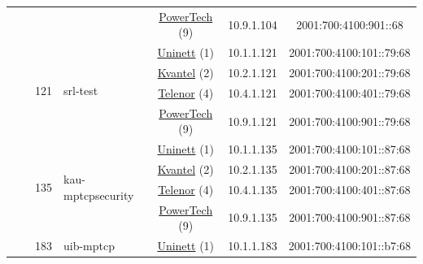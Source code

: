 \begin{small}
\begin{center}
\begin{longtable}{|c|c|c|c|c|c|c|c|}
  &  & \multicolumn{2}{|c|}{} & \multicolumn{2}{|c|}{\tiny{\href{http://www.powertech.no}{PowerTech} (9)}} & \tiny{10.9.1.104} & \tiny{2001:700:4100:901::68} \\* \cline{3-3}\cline{4-4}\cline{5-5}\cline{6-6}\cline{7-7}\cline{8-8}
  &  & \multirow{4}{*}{\tiny{121}} & \multicolumn{1}{|l|}{\multirow{4}{*}{\tiny{srl-test}}} & \multicolumn{2}{|c|}{\tiny{\href{https://www.uninett.no}{Uninett} (1)}} & \tiny{10.1.1.121} & \tiny{2001:700:4100:101::79:68} \\* \cline{5-5}\cline{6-6}\cline{7-7}\cline{8-8}
  &  &  &  & \multicolumn{2}{|c|}{\tiny{\href{http://kvantel.no}{Kvantel} (2)}} & \tiny{10.2.1.121} & \tiny{2001:700:4100:201::79:68} \\* \cline{5-5}\cline{6-6}\cline{7-7}\cline{8-8}
  &  &  &  & \multicolumn{2}{|c|}{\tiny{\href{https://www.telenor.no}{Telenor} (4)}} & \tiny{10.4.1.121} & \tiny{2001:700:4100:401::79:68} \\* \cline{5-5}\cline{6-6}\cline{7-7}\cline{8-8}
  &  &  &  & \multicolumn{2}{|c|}{\tiny{\href{http://www.powertech.no}{PowerTech} (9)}} & \tiny{10.9.1.121} & \tiny{2001:700:4100:901::79:68} \\* \cline{3-3}\cline{4-4}\cline{5-5}\cline{6-6}\cline{7-7}\cline{8-8}
  &  & \multirow{4}{*}{\tiny{135}} & \multicolumn{1}{|l|}{\multirow{4}{*}{\tiny{kau-mptcpsecurity}}} & \multicolumn{2}{|c|}{\tiny{\href{https://www.uninett.no}{Uninett} (1)}} & \tiny{10.1.1.135} & \tiny{2001:700:4100:101::87:68} \\* \cline{5-5}\cline{6-6}\cline{7-7}\cline{8-8}
  &  &  &  & \multicolumn{2}{|c|}{\tiny{\href{http://kvantel.no}{Kvantel} (2)}} & \tiny{10.2.1.135} & \tiny{2001:700:4100:201::87:68} \\* \cline{5-5}\cline{6-6}\cline{7-7}\cline{8-8}
  &  &  &  & \multicolumn{2}{|c|}{\tiny{\href{https://www.telenor.no}{Telenor} (4)}} & \tiny{10.4.1.135} & \tiny{2001:700:4100:401::87:68} \\* \cline{5-5}\cline{6-6}\cline{7-7}\cline{8-8}
  &  &  &  & \multicolumn{2}{|c|}{\tiny{\href{http://www.powertech.no}{PowerTech} (9)}} & \tiny{10.9.1.135} & \tiny{2001:700:4100:901::87:68} \\* \cline{3-3}\cline{4-4}\cline{5-5}\cline{6-6}\cline{7-7}\cline{8-8}
  &  & \multirow{4}{*}{\tiny{183}} & \multicolumn{1}{|l|}{\multirow{4}{*}{\tiny{uib-mptcp}}} & \multicolumn{2}{|c|}{\tiny{\href{https://www.uninett.no}{Uninett} (1)}} & \tiny{10.1.1.183} & \tiny{2001:700:4100:101::b7:68} \\* \cline{5-5}\cline{6-6}\cline{7-7}\cline{8-8}

\end{longtable}
\end{center}
\end{small}
